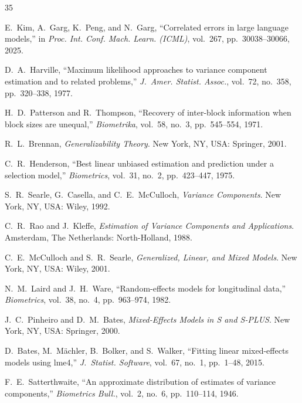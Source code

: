 \documentclass[journal]{IEEEtran}
\begin{document}

\begin{thebibliography}{35}

E.~Kim, A.~Garg, K.~Peng, and N.~Garg, ``Correlated errors in large language models,'' in \emph{Proc. Int. Conf. Mach. Learn. (ICML)}, vol.~267, pp.~30038--30066, 2025.

D.~A.~Harville, ``Maximum likelihood approaches to variance component estimation and to related problems,'' \emph{J.~Amer. Statist. Assoc.}, vol.~72, no.~358, pp.~320--338, 1977.

H.~D.~Patterson and R.~Thompson, ``Recovery of inter-block information when block sizes are unequal,'' \emph{Biometrika}, vol.~58, no.~3, pp.~545--554, 1971.

R.~L.~Brennan, \emph{Generalizability Theory}. New York, NY, USA: Springer, 2001.

C.~R.~Henderson, ``Best linear unbiased estimation and prediction under a selection model,'' \emph{Biometrics}, vol.~31, no.~2, pp.~423--447, 1975.

S.~R.~Searle, G.~Casella, and C.~E.~McCulloch, \emph{Variance Components}. New York, NY, USA: Wiley, 1992.

C.~R.~Rao and J.~Kleffe, \emph{Estimation of Variance Components and Applications}. Amsterdam, The Netherlands: North-Holland, 1988.

C.~E.~McCulloch and S.~R.~Searle, \emph{Generalized, Linear, and Mixed Models}. New York, NY, USA: Wiley, 2001.

N.~M.~Laird and J.~H.~Ware, ``Random-effects models for longitudinal data,'' \emph{Biometrics}, vol.~38, no.~4, pp.~963--974, 1982.

J.~C.~Pinheiro and D.~M.~Bates, \emph{Mixed-Effects Models in S and S-PLUS}. New York, NY, USA: Springer, 2000.

D.~Bates, M.~M\"{a}chler, B.~Bolker, and S.~Walker, ``Fitting linear mixed-effects models using lme4,'' \emph{J.~Statist. Software}, vol.~67, no.~1, pp.~1--48, 2015.

F.~E.~Satterthwaite, ``An approximate distribution of estimates of variance components,'' \emph{Biometrics Bull.}, vol.~2, no.~6, pp.~110--114, 1946.


\end{thebibliography}
\end{document}
